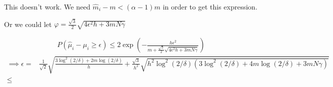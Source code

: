 \documentclass{article}
\newcommand{\eqn}[1]{\begin{align}#1\end{align}}
\theoremstyle{plain}
\theoremstyle{definition}
\begin{document}
This doesn't work. We need $\hat{m}_i - m < (\alpha-1)m$ in order to get this expression.

Or we could let $\varphi = \frac{\sqrt{3}}{2}\sqrt{4\epsilon^2 h+3mN\gamma}$

\eqn{
P(\hat{\mu}_i-\mu_i \geq \epsilon) \leq 2\exp({-\frac{h\epsilon^2}{m+\frac{\sqrt{3}}{2}\sqrt{4\epsilon^2 h+3mN\gamma}}})
}
\eqn{
\implies \epsilon = & \frac{1}{\sqrt{2}}\sqrt{\frac{3 \log^2(2/\delta)+2m\log(2/\delta)}{h}+\frac{\sqrt{3}}{h^2}\sqrt{h^2\log^2(2/\delta)(3\log^2(2/\delta)+4m\log(2/\delta)+3mN\gamma)}} \\
\leq & 
}
\end{document}
